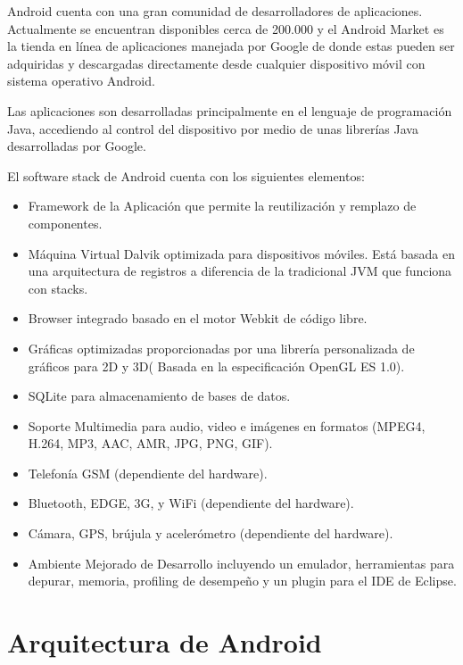 \documentclass[letterpaper,12pt]{book}
\begin{document}
\begin{mainmatter}
Android  cuenta   con  una   gran  comunidad  de   desarrolladores  de
aplicaciones. Actualmente se encuentran disponibles cerca de 200.000 y
el Android Market  es la tienda en línea  de aplicaciones manejada por
Google de donde estas pueden ser adquiridas y descargadas directamente
desde cualquier dispositivo móvil con sistema operativo Android.

Las  aplicaciones son  desarrolladas principalmente  en el  lenguaje de
programación Java, accediendo al  control del dispositivo por medio de
unas librerías Java desarrolladas por Google.



El software stack de Android cuenta con los siguientes elementos:
\begin{itemize}
\item  Framework  de la  Aplicación  que  permite  la reutilización  y
  remplazo de componentes.
\item   Máquina   Virtual    Dalvik   optimizada   para   dispositivos
  móviles. Está  basada en una arquitectura de  registros a diferencia
  de la tradicional JVM que  funciona con stacks.  
\item Browser integrado
  basado en el  motor Webkit de código libre.
\item Gráficas optimizadas
  proporcionadas por una librería  personalizada de gráficos para 2D y
  3D(  Basada  en la  especificación  OpenGL  ES  1.0). 
\item  SQLite  para
  almacenamiento de  bases de datos.  
\item Soporte Multimedia  para audio,
  video e imágenes en formatos (MPEG4, H.264, MP3, AAC, AMR, JPG, PNG,
  GIF). 
\item Telefonía GSM (dependiente del hardware).  
\item Bluetooth, EDGE,
  3G,  y WiFi  (dependiente del  hardware).  
\item Cámara,  GPS, brújula  y
  acelerómetro  (dependiente  del  hardware).  
\item Ambiente  Mejorado  de
  Desarrollo  incluyendo  un   emulador,  herramientas  para  depurar,
  memoria, profiling de desempeño y un plugin para el IDE de Eclipse. \\
\end{itemize}


\section{Arquitectura de Android}



\end{mainmatter}
\end{document}
